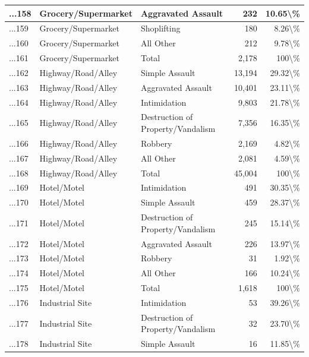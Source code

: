 \documentclass[
]{krantz}
\begin{document}
\begin{longtable}[t]{l|l|l|r|r}
\hline
...158 & Grocery/Supermarket & Aggravated Assault & 232 & 10.65\textbackslash{}\%\\
\hline
...159 & Grocery/Supermarket & Shoplifting & 180 & 8.26\textbackslash{}\%\\
\hline
...160 & Grocery/Supermarket & All Other & 212 & 9.78\textbackslash{}\%\\
\hline
...161 & Grocery/Supermarket & Total & 2,178 & 100\textbackslash{}\%\\
\hline
...162 & Highway/Road/Alley & Simple Assault & 13,194 & 29.32\textbackslash{}\%\\
\hline
...163 & Highway/Road/Alley & Aggravated Assault & 10,401 & 23.11\textbackslash{}\%\\
\hline
...164 & Highway/Road/Alley & Intimidation & 9,803 & 21.78\textbackslash{}\%\\
\hline
...165 & Highway/Road/Alley & Destruction of Property/Vandalism & 7,356 & 16.35\textbackslash{}\%\\
\hline
...166 & Highway/Road/Alley & Robbery & 2,169 & 4.82\textbackslash{}\%\\
\hline
...167 & Highway/Road/Alley & All Other & 2,081 & 4.59\textbackslash{}\%\\
\hline
...168 & Highway/Road/Alley & Total & 45,004 & 100\textbackslash{}\%\\
\hline
...169 & Hotel/Motel & Intimidation & 491 & 30.35\textbackslash{}\%\\
\hline
...170 & Hotel/Motel & Simple Assault & 459 & 28.37\textbackslash{}\%\\
\hline
...171 & Hotel/Motel & Destruction of Property/Vandalism & 245 & 15.14\textbackslash{}\%\\
\hline
...172 & Hotel/Motel & Aggravated Assault & 226 & 13.97\textbackslash{}\%\\
\hline
...173 & Hotel/Motel & Robbery & 31 & 1.92\textbackslash{}\%\\
\hline
...174 & Hotel/Motel & All Other & 166 & 10.24\textbackslash{}\%\\
\hline
...175 & Hotel/Motel & Total & 1,618 & 100\textbackslash{}\%\\
\hline
...176 & Industrial Site & Intimidation & 53 & 39.26\textbackslash{}\%\\
\hline
...177 & Industrial Site & Destruction of Property/Vandalism & 32 & 23.70\textbackslash{}\%\\
\hline
...178 & Industrial Site & Simple Assault & 16 & 11.85\textbackslash{}\%\\

\end{longtable}
\end{document}
